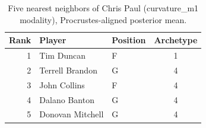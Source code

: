 \begin{table}[htbp]
  \centering\small
  \begin{tabular}{rllc}
    \toprule
    Rank & Player & Position & Archetype \\
    \midrule
    1 & Tim Duncan & F & 1 \\
    2 & Terrell Brandon & G & 4 \\
    3 & John Collins & F & 4 \\
    4 & Dalano Banton & G & 4 \\
    5 & Donovan Mitchell & G & 4 \\
    \bottomrule
  \end{tabular}
  \caption{Five nearest neighbors of Chris Paul (curvature_m1 modality), Procrustes-aligned posterior mean.}
  \label{tab:Chris_Paul_neighbors_curvature_m1}
\end{table}

